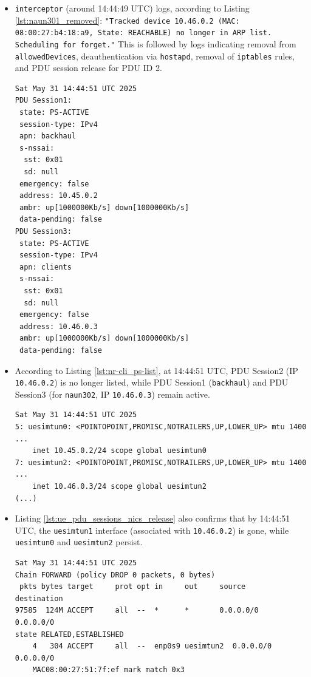 \begin{itemize}
    \item \texttt{interceptor} (around 14:44:49 \ac{UTC}) logs, according to Listing \ref{lst:naun301_removed}: \texttt{"Tracked device 10.46.0.2 (\ac{MAC}: 08:00:27:b4:18:a9, State: REACHABLE) no longer in \ac{ARP} list. Scheduling for forget."} This is followed by logs indicating removal from \texttt{allowedDevices}, deauthentication via \texttt{hostapd}, removal of \texttt{iptables} rules, and \ac{PDU} session release for \ac{PDU} ID 2.


\begin{lstlisting}[caption=\acs{PDU} session listing from UERANSIM,label={lst:nr-cli_ps-list}]
Sat May 31 14:44:51 UTC 2025
PDU Session1: 
 state: PS-ACTIVE
 session-type: IPv4
 apn: backhaul
 s-nssai: 
  sst: 0x01
  sd: null
 emergency: false
 address: 10.45.0.2
 ambr: up[1000000Kb/s] down[1000000Kb/s]
 data-pending: false
PDU Session3: 
 state: PS-ACTIVE
 session-type: IPv4
 apn: clients
 s-nssai: 
  sst: 0x01
  sd: null
 emergency: false
 address: 10.46.0.3
 ambr: up[1000000Kb/s] down[1000000Kb/s]
 data-pending: false
\end{lstlisting}

    \item According to Listing \ref{lst:nr-cli_ps-list}, at 14:44:51 \ac{UTC}, \ac{PDU} Session2 (\ac{IP} \texttt{10.46.0.2}) is no longer listed, while \ac{PDU} Session1 (\texttt{backhaul}) and \ac{PDU} Session3 (for \texttt{naun302}, \ac{IP} \texttt{10.46.0.3}) remain active.

\begin{lstlisting}[caption=\acs{PDU} binded network interfaces after \texttt{uesimtun1} removal,label={lst:ue_pdu_sessions_nics_release}]
Sat May 31 14:44:51 UTC 2025
5: uesimtun0: <POINTOPOINT,PROMISC,NOTRAILERS,UP,LOWER_UP> mtu 1400 ...
    inet 10.45.0.2/24 scope global uesimtun0
7: uesimtun2: <POINTOPOINT,PROMISC,NOTRAILERS,UP,LOWER_UP> mtu 1400 ...
    inet 10.46.0.3/24 scope global uesimtun2
(...)
\end{lstlisting}
    
    \item Listing \ref{lst:ue_pdu_sessions_nics_release} also confirms that by 14:44:51 \ac{UTC}, the \texttt{uesimtun1} interface (associated with \texttt{10.46.0.2}) is gone, while \texttt{uesimtun0} and \texttt{uesimtun2} persist.

\begin{lstlisting}[caption=Mapping rules after \texttt{naun301} disconnect and \acs{PDU} Session2 release,label={lst:ue_naun3_to_pdu_mapping_rules}]
Sat May 31 14:44:51 UTC 2025
Chain FORWARD (policy DROP 0 packets, 0 bytes)
 pkts bytes target     prot opt in     out     source       destination         
97585  124M ACCEPT     all  --  *      *       0.0.0.0/0    0.0.0.0/0            
state RELATED,ESTABLISHED
    4   304 ACCEPT     all  --  enp0s9 uesimtun2  0.0.0.0/0    0.0.0.0/0            
    MAC08:00:27:51:7f:ef mark match 0x3
\end{lstlisting}


\end{itemize}
